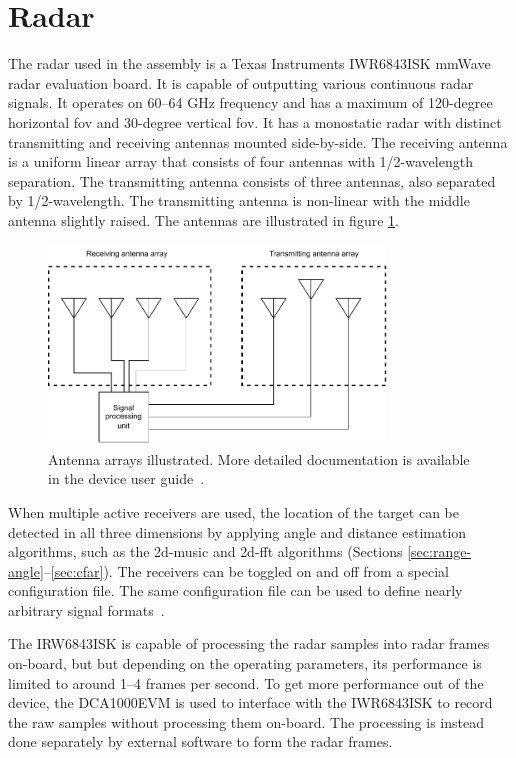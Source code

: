 \section{Radar}
\label{sec:2-radar}
The radar used in the assembly is a Texas Instruments IWR6843ISK mmWave radar evaluation board.
It is capable of outputting various continuous radar signals.
It operates on 60--64 GHz frequency and has a maximum of 120-degree horizontal \gls{fov} and 30-degree vertical \gls{fov}.
It has a monostatic radar with distinct transmitting and receiving antennas mounted side-by-side.
The receiving antenna is a uniform linear array that consists of four antennas with 1/2-wavelength separation.
The transmitting antenna consists of three antennas, also separated by 1/2-wavelength.
The transmitting antenna is non-linear with the middle antenna slightly raised.
The antennas are illustrated in figure \ref{fig:antennas}.

\begin{figure}[H]
    \centering
    \includegraphics[width=0.8\textwidth]{fig/3/antennas.pdf}
    \caption{Antenna arrays illustrated. More detailed documentation is available in the device user guide~\cite{ti-iwr-user-guide}.}
    \label{fig:antennas}
\end{figure}

When multiple active receivers are used,
the location of the target can be detected in all three dimensions by applying angle and distance estimation algorithms,
such as the \gls{2d-music} and \gls{2d-fft} algorithms (Sections \ref{sec:range-angle}--\ref{sec:cfar}).
The receivers can be toggled on and off from a special configuration file.
The same configuration file can be used to define nearly arbitrary signal formats~\cite{mmwave-sdk-user-guide}.

The IRW6843ISK is capable of processing the radar samples into radar frames on-board,
but but depending on the operating parameters,
its performance is limited to around 1--4 frames per second.
To get more performance out of the device,
the DCA1000EVM is used to interface with the IWR6843ISK to record the raw samples without processing them on-board.
The processing is instead done separately by external software to form the radar frames.

